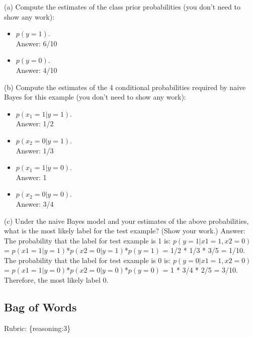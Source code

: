\documentclass{article}
\def\blu#1{{\color{blu}#1}}
\def\gre#1{{\color{gre}#1}}
\def\items#1{\begin{itemize}#1\end{itemize}}
\def\rubric#1{\gre{Rubric: \{#1\}}}{}
\begin{document}
\blu{(a) Compute the estimates of the class prior probabilities} (you don't need to show any work):
\items{
\item$ p(y = 1)$.
 \textcolor{gre}{\\Answer: 6/10}
\item $p(y = 0)$.
 \textcolor{gre}{\\Answer: 4/10}
}

\blu{(b) Compute the estimates of the 4 conditional probabilities required by naive Bayes for this example}  (you don't need to show any work):
\items{
\item $p(x_1 = 1 | y = 1)$.
 \textcolor{gre}{\\Answer: 1/2}
\item $p(x_2 = 0 | y = 1)$.
 \textcolor{gre}{\\Answer: 1/3}
\item $p(x_1 = 1 | y = 0)$.
 \textcolor{gre}{\\Answer: 1}
\item $p(x_2 = 0 | y = 0)$.
 \textcolor{gre}{\\Answer: 3/4}
}

\blu{(c) Under the naive Bayes model and your estimates of the above probabilities, what is the most likely label for the test example? (Show your work.)}
\newline
\gre{Answer: The probability that the label for test example is 1 is: \newline $p(y=1|x1=1,x2=0)$ = $p(x1=1|y=1)$*$p(x2=0|y=1)$*$p(y=1)$ = 1/2 * 1/3 * 3/5 = 1/10.
\newline \newline The probability that the label for test example is 0 is: \newline $p(y=0 | x1=1,x2=0)$ = $p(x1=1|y=0)$*$p(x2=0|y=0)$*$p(y=0)$ = 1 * 3/4 * 2/5 = 3/10.
\newline \newline Therefore, the most likely label 0.}

\subsection{Bag of Words}
\rubric{reasoning:3}
\end{document}
